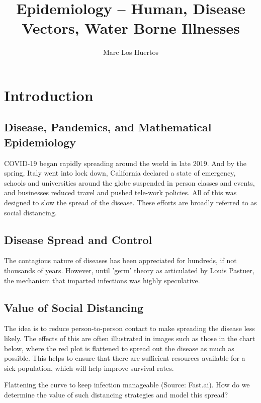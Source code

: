 \documentclass{article}\usepackage[]{graphicx}\usepackage[]{color}
\title{Epidemiology -- Human, Disease Vectors, Water Borne Illnesses}
\author{Marc Los Huertos}
\begin{document}
\maketitle

\section{Introduction}

\subsection{Disease, Pandemics, and Mathematical Epidemiology}

COVID-19 began rapidly spreading around the world in late 2019. And by the spring, Italy went into lock down, California declared a state of emergency, schools and universities around the globe suspended in person classes and events, and businesses reduced travel and pushed tele-work policies. All of this was designed to slow the spread of the disease. These efforts are broadly referred to as social distancing.

\subsection{Disease Spread and Control}

The contagious nature of diseases has been appreciated for hundreds, if not thousands of years. However, until 'germ' theory as articulated by Louis Pastuer, the mechanism that imparted infections was highly speculative. 



\subsection{Value of Social Distancing}

The idea is to reduce person-to-person contact to make spreading the disease less likely. The effects of this are often illustrated in images such as those in the chart below, where the red plot is flattened to spread out the disease as much as possible. This helps to ensure that there are sufficient resources available for a sick population, which will help improve survival rates.

Flattening the curve to keep infection manageable (Source: Fast.ai).
How do we determine the value of such distancing strategies and model this spread?
\end{document}

